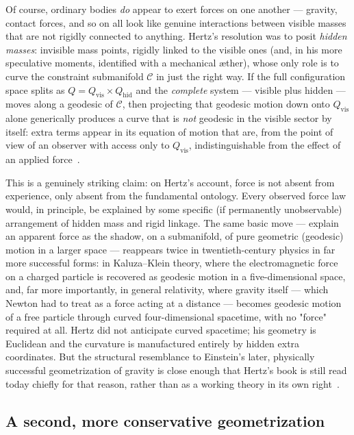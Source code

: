 Of course, ordinary bodies \emph{do} appear to exert forces on one
another --- gravity, contact forces, and so on all look like genuine
interactions between visible masses that are not rigidly connected
to anything. Hertz's resolution was to posit \emph{hidden masses}:
invisible mass points, rigidly linked to the visible ones (and, in
his more speculative moments, identified with a mechanical
\ae{}ther), whose only role is to curve the constraint submanifold
$\mathcal C$ in just the right way. If the full configuration space
splits as $Q = Q_{\mathrm{vis}}\times Q_{\mathrm{hid}}$ and the
\emph{complete} system --- visible plus hidden --- moves along a
geodesic of $\mathcal C$, then projecting that geodesic motion down
onto $Q_{\mathrm{vis}}$ alone generically produces a curve that is
\emph{not} geodesic in the visible sector by itself: extra terms
appear in its equation of motion that are, from the point of view of
an observer with access only to $Q_{\mathrm{vis}}$, indistinguishable
from the effect of an applied force~\cite{Hertz1894,Lutzen2005}.

This is a genuinely striking claim: on Hertz's account, force is not
absent from experience, only absent from the fundamental ontology.
Every observed force law would, in principle, be explained by some
specific (if permanently unobservable) arrangement of hidden mass
and rigid linkage. The same basic move --- explain an apparent force
as the shadow, on a submanifold, of pure geometric (geodesic) motion
in a larger space --- reappears twice in twentieth-century physics
in far more successful forms: in Kaluza--Klein theory, where the
electromagnetic force on a charged particle is recovered as geodesic
motion in a five-dimensional space, and, far more importantly, in
general relativity, where gravity itself --- which Newton had to
treat as a force acting at a distance --- becomes geodesic motion of
a free particle through curved four-dimensional spacetime, with no
"force" required at all. Hertz did not anticipate curved spacetime;
his geometry is Euclidean and the curvature is manufactured entirely
by hidden extra coordinates. But the structural resemblance to
Einstein's later, physically successful geometrization of gravity is
close enough that Hertz's book is still read today chiefly for that
reason, rather than as a working theory in its own
right~\cite{Lutzen2005}.

\subsection{A second, more conservative geometrization}

